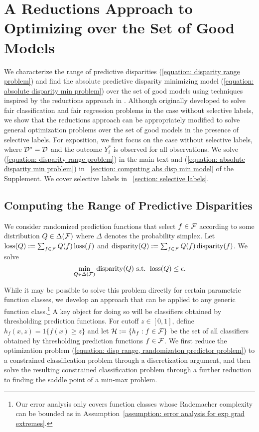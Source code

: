 \documentclass{article}
\begin{document}
\section{A Reductions Approach to Optimizing over the Set of Good Models}\label{section: reductions approach}
We characterize the range of predictive disparities (\ref{equation: disparity range problem}) and find the absolute predictive disparity minimizing model (\ref{equation: absolute disparity min problem}) over the set of good models using techniques inspired by the reductions approach in \cite{agarwal2018reductions, AgarwalEtAl(19)-FairRegression}. Although originally developed to solve fair classification and fair regression problems in the case without selective labels, we show that the reductions approach can be appropriately modified to solve general optimization problems over the set of good models in the presence of selective labels.
For exposition, we first focus on the case without selective labels, where $\mathcal{D}^* = \mathcal{D}$ and the outcome $Y_i^*$ is observed for all observations. We solve (\ref{equation: disparity range problem}) in the main text and (\ref{equation: absolute disparity min problem}) in \textsection~\ref{section: computing abs disp min model} of the Supplement. We cover selective labels in \textsection~\ref{section: selective labels}.

\subsection{Computing the Range of Predictive Disparities}\label{section: range of predictive disparities}

We consider randomized prediction functions that select $f \in\mathcal{F}$ according to some distribution $Q \in \Delta(\mathcal{F})$ where $\Delta$ denotes the probability simplex. Let $\operatorname{loss}(Q) := \sum_{f \in \mathcal{F}} Q(f) \operatorname{loss}(f)$ and $\operatorname{disparity}(Q) := \sum_{f \in \mathcal{F}} Q(f) \operatorname{disparity}(f)$. We solve
    \begin{equation}\label{equation: disp range, randomizaton predictor problem}
        \min_{Q \in \Delta(\mathcal{F})} \operatorname{disparity}(Q) \mbox{ s.t. } \operatorname{loss}(Q) \leq \epsilon.
    \end{equation}
    
While it may be possible to solve this problem directly for certain parametric function classes, we develop an approach that can be applied to any generic function class.\footnote{Our error analysis only covers function classes whose Rademacher complexity can be bounded as in Assumption~\ref{assumption: error analysis for exp grad extremes}.}
A key object for doing so will be classifiers obtained by thresholding prediction functions. For cutoff $z \in [0, 1]$, define $h_f(x, z) = 1\{f(x) \geq z\}$ and let $\mathcal{H} := \{h_f : f \in \mathcal{F}\}$ be the set of all classifiers obtained by thresholding prediction functions $f \in \mathcal{F}$. We first reduce the optimization problem (\ref{equation: disp range, randomizaton predictor problem}) to a constrained classification problem through a discretization argument, and then solve the resulting constrained classification problem through a further reduction to finding the saddle point of a min-max problem.
\end{document}
